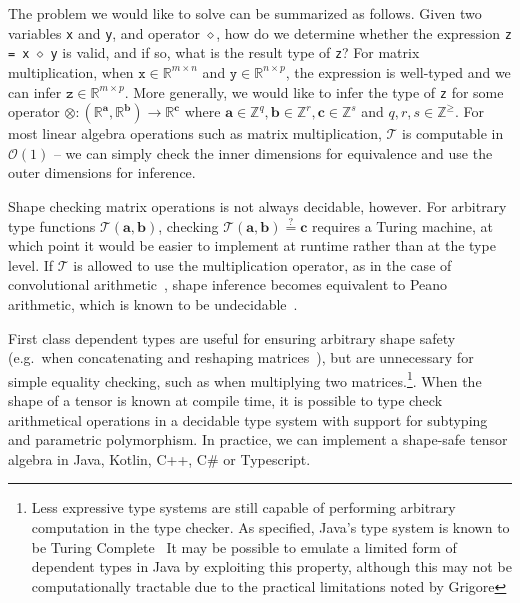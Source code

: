 \documentclass[12pt,initial,twoside,maitrise]{dms}
\def\inline{\lstinline[basicstyle=\ttfamily]}
\numberwithin{equation}{section}
\numberwithin{table}{chapter}
\numberwithin{figure}{chapter}
\begin{document}
The problem we would like to solve can be summarized as follows. Given two variables \inline{x} and \inline{y}, and operator $\diamond$, how do we determine whether the expression \inline{z = x} $\diamond$ \inline{y} is valid, and if so, what is the result type of \inline{z}? For matrix multiplication, when $\texttt{x} \in \mathbb{R}^{m \times n}$ and $\texttt{y} \in \mathbb{R}^{n \times p}$, the expression is well-typed and we can infer $\texttt{z} \in \mathbb{R}^{m \times p}$. More generally, we would like to infer the type of \inline{z} for some operator $\otimes: (\mathbb{R}^\mathbf{a}, \mathbb{R}^\mathbf{b}) \rightarrow \mathbb{R}^\mathbf{c}$ where $\mathbf{a} \in \mathbb{Z}^q, \mathbf{b} \in \mathbb{Z}^r, \mathbf{c} \in \mathbb{Z}^s$ and $q, r, s \in \mathbb{Z}^\geq$. For most linear algebra operations such as matrix multiplication, $\mathcal{T}$ is computable in $\mathcal{O}(1)$ -- we can simply check the inner dimensions for equivalence and use the outer dimensions for inference.

Shape checking matrix operations is not always decidable, however. For arbitrary type functions $\mathcal{T}(\mathbf{a}, \mathbf{b})$, checking $\mathcal{T}(\mathbf{a}, \mathbf{b}) \stackrel{?}{=} \mathbf{c}$ requires a Turing machine, at which point it would be easier to implement at runtime rather than at the type level. If $\mathcal{T}$ is allowed to use the multiplication operator, as in the case of convolutional arithmetic~\citep{dumoulin2016guide}, shape inference becomes equivalent to Peano arithmetic, which is known to be undecidable~\citep{godel1931formal}.

First class dependent types are useful for ensuring arbitrary shape safety (e.g.\ when concatenating and reshaping matrices~\citep{xi1998eliminating}), but are unnecessary for simple equality checking, such as when multiplying two matrices.\footnote{Less expressive type systems are still capable of performing arbitrary computation in the type checker. As specified, Java's type system is known to be Turing Complete~\citep{Grigore:2017:JGT:3009837.3009871} It may be possible to emulate a limited form of dependent types in Java by exploiting this property, although this may not be computationally tractable due to the practical limitations noted by Grigore}. When the shape of a tensor is known at compile time, it is possible to type check arithmetical operations in a decidable type system with support for subtyping and parametric polymorphism. In practice, we can implement a shape-safe tensor algebra in Java, Kotlin, C++, C\# or Typescript.
\end{document}
